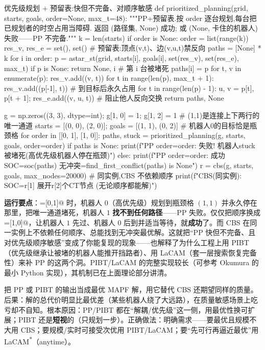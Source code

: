 \begin{codebox}[Python]{优先级规划 $+$ 预留表:快但不完备、对顺序敏感}
def prioritized_planning(grid, starts, goals, order=None, max_t=48):
    """PP+预留表.按 order 逐台规划,每台把已规划者的时空占用当障碍.
    返回 (路径集, None) 成功; 或 (None, 卡住的机器人) 失败——PP 不完备."""
    k = len(starts)
    if order is None: order = list(range(k))
    res_v, res_e = set(), set()                          # 预留表:顶点(v,t)、边(v,u,t)禁反向
    paths = [None] * k
    for i in order:
        p = astar_st(grid, starts[i], goals[i], set(res_v), set(res_e), max_t)
        if p is None: return None, i                     # 第 i 台被堵死
        paths[i] = p
        for t, v in enumerate(p): res_v.add((v, t))
        for t in range(len(p), max_t + 1): res_v.add((p[-1], t))     # 到目标后永久占用
        for t in range(len(p) - 1):
            u, v = p[t], p[t + 1]; res_e.add((v, u, t))              # 阻止他人反向交换
    return paths, None

g = np.zeros((3, 3), dtype=int); g[1, 0] = 1; g[1, 2] = 1   # (1,1)是连接上下两行的唯一通道
starts = [(0, 0), (2, 0)]; goals = [(1, 1), (0, 2)]         # 机器人0的目标恰是瓶颈格
for order in [[0, 1], [1, 0]]:
    paths, stuck = prioritized_planning(g, starts, goals, order=order)
    if paths is None:
        print(f"PP order={order}: 失败! 机器人{stuck}被堵死(高优先级机器人停在瓶颈)")
    else:
        print(f"PP order={order}: 成功 SOC={soc(paths)} 无冲突={find_first_conflict(paths) is None}")
r = cbs(g, starts, goals, max_nodes=20000)                 # 同实例,CBS 不依赖顺序
print(f"CBS(同实例): SOC={r[1]} 展开{r[2]}个CT节点 (无论顺序都能解)")
\end{codebox}

\textbf{运行要点}：\verb@order=[0,1]@ 时，机器人 $0$（高优先级）规划到瓶颈格 $(1,1)$ 并永久停在那里，把唯一通道堵死，机器人 $1$ \textbf{找不到任何路径}——PP 失败。仅仅把顺序换成 \verb@order=[1,0]@，让机器人 $1$ 先过、机器人 $0$ 后到并适当等待，就\textbf{成功}了。而 CBS 在同一实例上不依赖任何顺序、总能找到无冲突最优解。这就把“PP 快但不完备、且对优先级顺序敏感”变成了你能复现的现象——也解释了为什么工程上用 PIBT（优先级继承让被堵的机器人能推开挡路者）、用 LaCAM（套一层搜索恢复完备性）来补 PP 的这两个洞。PIBT/LaCAM 的完整实现较长（可参考 Okumura 的 \verb@pypibt@ 最小 Python 实现），其机制已在上面理论部分讲清。

\begin{pitfall}
把 PP 或 PIBT 的输出当成最优 MAPF 解，用它替代 CBS 还期望同样的质量。后果：解的总代价明显比最优差（某些机器人绕了大远路），在质量敏感场景上吃亏却不自知。根本原因：PP/PIBT 都在“解耦/优先级”这一侧，用最优性换可扩展；PIBT 还是\textbf{短视}的（只规划一步）。正确做法：明确需求——要最优且规模不大用 CBS；要规模/实时可接受次优用 PIBT/LaCAM；要“先可行再逼近最优”用 LaCAM\textsuperscript{*}（anytime）。
\end{pitfall}

